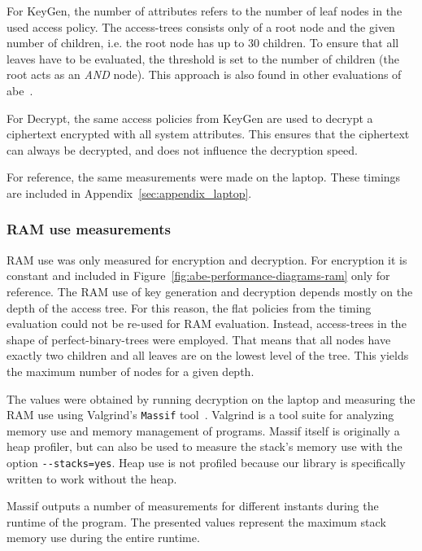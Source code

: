 For KeyGen, the number of attributes refers to the number of leaf nodes in the used access policy.
The \glspl{access-tree} consists only of a root node and the given number of children, i.e. the root node has up to 30 children. 
To ensure that all leaves have to be evaluated, the threshold is set to the number of children (the root acts as an \emph{AND} node).
This approach is also found in other evaluations of \acrshort{abe}~\cite{girgenti_feasibility_2019}.

For Decrypt, the same access policies from KeyGen are used to decrypt a ciphertext encrypted with all system attributes.
This ensures that the ciphertext can always be decrypted, and does not influence the decryption speed.

For reference, the same measurements were made on the laptop.
These timings are included in Appendix~\ref{sec:appendix_laptop}.

\subsubsection{RAM use measurements}


RAM use was only measured for encryption and decryption. 
For encryption it is constant and included in Figure~\ref{fig:abe-performance-diagrams-ram} only for reference.
The RAM use of key generation and decryption depends mostly on the depth of the access tree.
For this reason, the flat policies from the timing evaluation could not be re-used for RAM evaluation.
Instead, \glspl{access-tree} in the shape of \glspl{perfect-binary-tree} were employed.
That means that all nodes have exactly two children and all leaves are on the lowest level of the tree.
This yields the maximum number of nodes for a given depth.

The values were obtained by running decryption on the laptop and measuring the RAM use using Valgrind's \texttt{Massif} tool~\cite{nethercote_massif_nodate}.
Valgrind is a tool suite for analyzing memory use and memory management of programs.
Massif itself is originally a heap profiler, but can also be used to measure the stack's memory use with the option \verb+--stacks=yes+.
Heap use is not profiled because our library is specifically written to work without the heap.

Massif outputs a number of measurements for different instants during the runtime of the program. 
The presented values represent the maximum stack memory use during the entire runtime.

